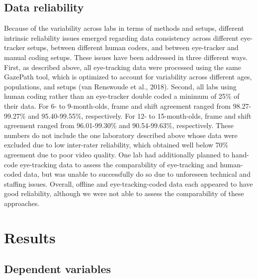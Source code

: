\documentclass[english,,man,floatsintext]{apa6}
\begin{document}
\hypertarget{data-reliability}{%
\subsection{Data reliability}\label{data-reliability}}

Because of the variability across labs in terms of methods and setups, different intrinsic reliability issues emerged regarding data consistency across different eye-tracker setups, between different human coders, and between eye-tracker and manual coding setups. These issues have been addressed in three different ways. First, as described above, all eye-tracking data were processed using the same GazePath tool, which is optimized to account for variability across different ages, populations, and setups (van Renswoude et al., 2018). Second, all labs using human coding rather than an eye-tracker double coded a minimum of 25\% of their data. For 6- to 9-month-olds, frame and shift agreement ranged from 98.27-99.27\% and 95.40-99.55\%, respectively. For 12- to 15-month-olds, frame and shift agreement ranged from 96.01-99.30\% and 90.54-99.63\%, respectively. These numbers do not include the one laboratory described above whose data were excluded due to low inter-rater reliability, which obtained well below 70\% agreement due to poor video quality. One lab had additionally planned to hand-code eye-tracking data to assess the comparability of eye-tracking and human-coded data, but was unable to successfully do so due to unforeseen technical and staffing issues. Overall, offline and eye-tracking-coded data each appeared to have good reliability, although we were not able to assess the comparability of these approaches.

\hypertarget{results}{%
\section{Results}\label{results}}

\hypertarget{dependent-variables}{%
\subsection{Dependent variables}\label{dependent-variables}}
\end{document}
